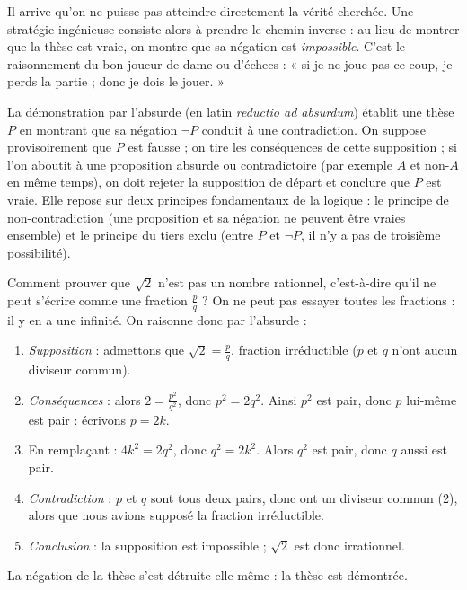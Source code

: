 \documentclass[11pt]{article}
\newcommand{\cle}[1]{{\popxbold\color{popdark}#1}}
\begin{document}
Il arrive qu'on ne puisse pas atteindre directement la vérité cherchée. Une stratégie ingénieuse consiste alors à prendre le chemin inverse : au lieu de montrer que la thèse est vraie, on montre que sa négation est \emph{impossible}. C'est le raisonnement du bon joueur de dame ou d'échecs : « si je ne joue pas ce coup, je perds la partie ; donc je dois le jouer. »

\begin{definition}
La \cle{démonstration par l'absurde} (en latin \emph{reductio ad absurdum}) établit une thèse $P$ en montrant que sa négation $\neg P$ conduit à une contradiction. On suppose provisoirement que $P$ est fausse ; on tire les conséquences de cette supposition ; si l'on aboutit à une proposition absurde ou contradictoire (par exemple $A$ et non-$A$ en même temps), on doit rejeter la supposition de départ et conclure que $P$ est vraie. Elle repose sur deux principes fondamentaux de la logique : le \cle{principe de non-contradiction} (une proposition et sa négation ne peuvent être vraies ensemble) et le \cle{principe du tiers exclu} (entre $P$ et $\neg P$, il n'y a pas de troisième possibilité).
\end{definition}

\begin{exemplebox}
Comment prouver que $\sqrt{2}$ n'est pas un nombre rationnel, c'est-à-dire qu'il ne peut s'écrire comme une fraction $\frac{p}{q}$ ? On ne peut pas essayer toutes les fractions : il y en a une infinité. On raisonne donc par l'absurde :
\begin{enumerate}
\item \emph{Supposition} : admettons que $\sqrt{2} = \frac{p}{q}$, fraction irréductible ($p$ et $q$ n'ont aucun diviseur commun).
\item \emph{Conséquences} : alors $2 = \frac{p^2}{q^2}$, donc $p^2 = 2q^2$. Ainsi $p^2$ est pair, donc $p$ lui-même est pair : écrivons $p = 2k$.
\item En remplaçant : $4k^2 = 2q^2$, donc $q^2 = 2k^2$. Alors $q^2$ est pair, donc $q$ aussi est pair.
\item \emph{Contradiction} : $p$ et $q$ sont tous deux pairs, donc ont un diviseur commun (2), alors que nous avions supposé la fraction irréductible.
\item \emph{Conclusion} : la supposition est impossible ; $\sqrt{2}$ est donc irrationnel.
\end{enumerate}
La négation de la thèse s'est détruite elle-même : la thèse est démontrée.
\end{exemplebox}
\end{document}

